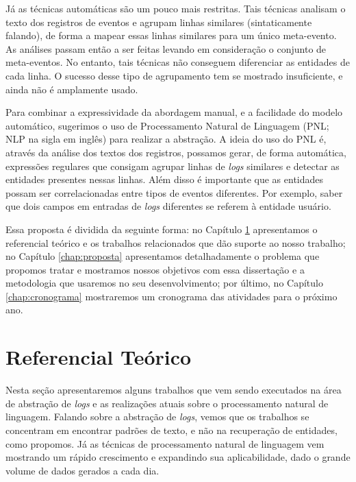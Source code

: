 \documentclass[
	12pt,				%
	openright,			%
	twoside,			%
	a4paper,			%
	english,			%
	spanish,			%
	brazil,				%
	]{abntex2}
\begin{document}
Já as técnicas automáticas são um pouco mais restritas. Tais técnicas analisam o texto dos registros de eventos e agrupam linhas similares (sintaticamente falando), de forma a mapear essas linhas similares para um único meta-evento. As análises passam então a ser feitas levando em consideração o conjunto de meta-eventos. No entanto, tais técnicas não conseguem diferenciar as entidades de cada linha. O sucesso desse tipo de agrupamento tem se mostrado insuficiente, e ainda não é amplamente usado.


Para combinar a expressividade da abordagem manual, e a facilidade do modelo automático, sugerimos o uso de Processamento Natural de Linguagem (PNL; NLP na sigla em inglês) para realizar a abstração. A ideia do uso do PNL é, através da análise dos textos dos registros, possamos gerar, de forma automática, expressões regulares que consigam agrupar linhas de \emph{logs} similares e detectar as entidades presentes nessas linhas. Além disso é importante que as entidades possam ser correlacionadas entre tipos de eventos diferentes. Por exemplo, saber que dois campos em entradas de \emph{logs} diferentes se referem à entidade usuário.

Essa proposta é dividida da seguinte forma: no Capítulo \ref{chap:referencial} apresentamos o referencial teórico e os trabalhos relacionados que dão suporte ao nosso trabalho; no Capítulo \ref{chap:proposta} apresentamos detalhadamente o problema que propomos tratar e mostramos nossos objetivos com essa dissertação e a metodologia que usaremos no seu desenvolvimento; por último, no Capítulo \ref{chap:cronograma} mostraremos um cronograma das atividades para o próximo ano.

\chapter{Referencial Teórico}\label{chap:referencial}

Nesta seção apresentaremos alguns trabalhos que vem sendo executados na área de abstração de \emph{logs} e as realizações atuais sobre o processamento natural de linguagem. Falando sobre a abstração de \emph{logs}, vemos que os trabalhos se concentram em encontrar padrões de texto, e não na recuperação de entidades, como propomos. Já as técnicas de processamento natural de linguagem vem mostrando um rápido crescimento e expandindo sua aplicabilidade, dado o grande volume de dados gerados a cada dia.
\end{document}
